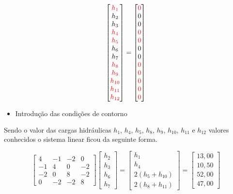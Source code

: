 \documentclass{article} %
\begin{document}
\begin{equation}
\begin{bmatrix}
\color{red}h_1\\h_2\\h_3\\\color{red}h_4\\\color{red}h_5\\h_6\\h_7\\\color{red}h_8\\\color{red}h_9\\\color{red}h_{10}\\\color{red}h_{11}\\\color{red}h_{12}\\
\end{bmatrix}=\begin{bmatrix}
\color{red}0\\0\\0\\\color{red}0\\\color{red}0\\0\\0\\\color{red}0\\\color{red}0\\\color{red}0\\\color{red}0\\\color{red}0
\end{bmatrix}
\end{equation}
\begin{itemize}
	\item Introdução das condições de contorno
\end{itemize}

Sendo o valor das cargas hidráulicas \(h_1\), \(h_4\), \(h_5\), \(h_8\), \(h_9\), \(h_{10}\), \(h_{11}\) e \(h_{12}\) valores conhecidos o sistema linear ficou da seguinte forma.


\begin{equation}
\begin{bmatrix}
4&-1&-2&0\\
-1&4&0&-2\\
-2&0&8&-2\\
0&-2&-2&8
\end{bmatrix}\begin{bmatrix}
h_2\\h_3\\h_6\\h_7
\end{bmatrix}=\begin{bmatrix}
h_1\\h_4\\2(h_5+h_{10})\\2(h_8+h_{11})
\end{bmatrix}=\begin{bmatrix}
13,00\\10,50\\52,00\\47,00
\end{bmatrix}
\end{equation}
\end{document}
